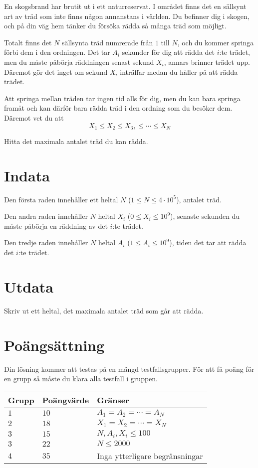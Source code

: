 
En skogsbrand har brutit ut i ett naturreservat. I området finns det en sällsynt art av träd
som inte finns någon annanstans i världen. Du befinner dig i skogen, och på din väg hem tänker du försöka rädda så många träd som möjligt.

Totalt finns det $N$ sällsynta träd numrerade från $1$ till $N$, och du kommer springa förbi dem i den ordningen. 
Det tar $A_i$ sekunder för dig att rädda det $i$:te trädet, men du måste påbörja räddningen
senast sekund $X_i$, annars brinner trädet upp. Däremot gör det inget om sekund $X_i$ inträffar medan
du håller på att rädda trädet.

Att springa mellan träden tar ingen tid alls för dig, men du kan bara springa framåt och kan därför
bara rädda träd i den ordning som du besöker dem. Däremot vet du att
$$X_1 \leq X_2 \leq X_3, \leq \cdots \leq X_N$$

Hitta det maximala antalet träd du kan rädda.

\section*{Indata}

Den första raden innehåller ett heltal $N$ ($1 \leq N \leq 4 \cdot 10^5$), antalet träd.

Den andra raden innehåller $N$ heltal $X_i$ ($0 \leq X_i \leq 10^9$), senaste sekunden du måste
påbörja en räddning av det $i$:te trädet.

Den tredje raden innehåller $N$ heltal $A_i$ ($1 \leq A_i \leq 10^9$), tiden det tar att rädda det 
$i$:te trädet.

\section*{Utdata}
Skriv ut ett heltal, det maximala antalet träd som går att rädda.

\section*{Poängsättning}
Din lösning kommer att testas på en mängd testfallsgrupper.
För att få poäng för en grupp så måste du klara alla testfall i gruppen.

\noindent
\begin{tabular}{| l | l | p{12cm} |}
  \hline
  Grupp & Poängvärde & Gränser \\ \hline
  $1$   & $10$       & $A_1 = A_2 = \cdots = A_N$\\ \hline
  $2$   & $18$       & $X_1 = X_2 = \cdots = X_N$  \\ \hline
  $3$   & $15$       & $N, A_i, X_i \leq 100$ \\ \hline
  $3$   & $22$       & $N \leq 2000$ \\ \hline
  $4$   & $35$       & Inga ytterligare begränsningar \\ \hline
\end{tabular}